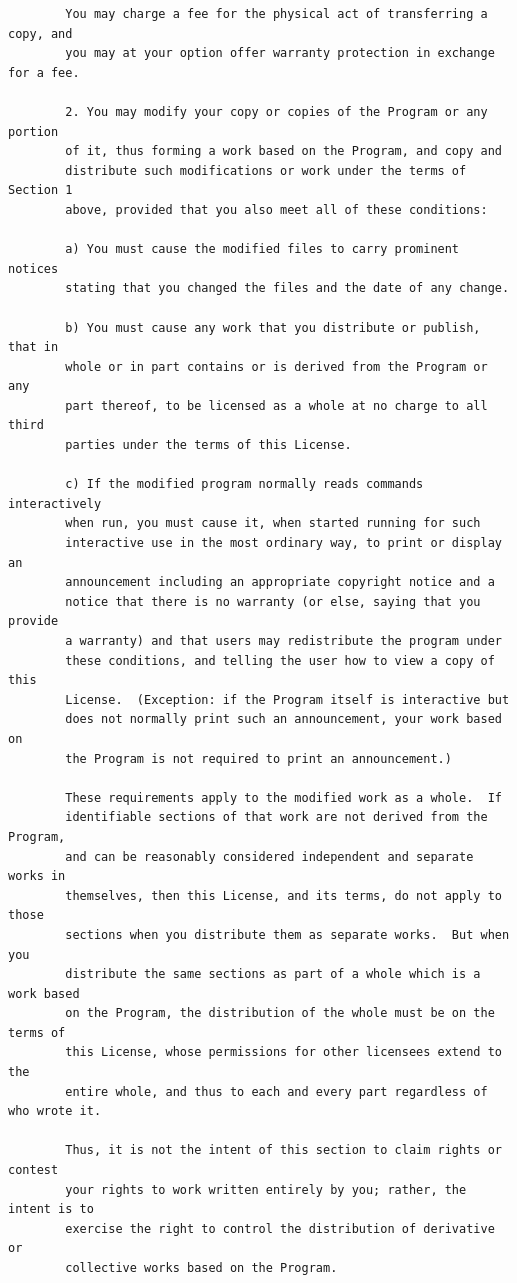 \documentclass[a4paper,twoside,12pt]{book}
\begin{document}
{\begin{verbatim}
		You may charge a fee for the physical act of transferring a copy, and
		you may at your option offer warranty protection in exchange for a fee.

		2. You may modify your copy or copies of the Program or any portion
		of it, thus forming a work based on the Program, and copy and
		distribute such modifications or work under the terms of Section 1
		above, provided that you also meet all of these conditions:

		a) You must cause the modified files to carry prominent notices
		stating that you changed the files and the date of any change.

		b) You must cause any work that you distribute or publish, that in
		whole or in part contains or is derived from the Program or any
		part thereof, to be licensed as a whole at no charge to all third
		parties under the terms of this License.

		c) If the modified program normally reads commands interactively
		when run, you must cause it, when started running for such
		interactive use in the most ordinary way, to print or display an
		announcement including an appropriate copyright notice and a
		notice that there is no warranty (or else, saying that you provide
		a warranty) and that users may redistribute the program under
		these conditions, and telling the user how to view a copy of this
		License.  (Exception: if the Program itself is interactive but
		does not normally print such an announcement, your work based on
		the Program is not required to print an announcement.)

		These requirements apply to the modified work as a whole.  If
		identifiable sections of that work are not derived from the Program,
		and can be reasonably considered independent and separate works in
		themselves, then this License, and its terms, do not apply to those
		sections when you distribute them as separate works.  But when you
		distribute the same sections as part of a whole which is a work based
		on the Program, the distribution of the whole must be on the terms of
		this License, whose permissions for other licensees extend to the
		entire whole, and thus to each and every part regardless of who wrote it.

		Thus, it is not the intent of this section to claim rights or contest
		your rights to work written entirely by you; rather, the intent is to
		exercise the right to control the distribution of derivative or
		collective works based on the Program.


\end{verbatim}}
\end{document}
